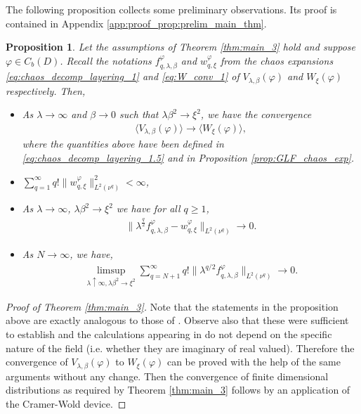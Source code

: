 \documentclass[a4paper, 11pt, reqno]{amsart}
\theoremstyle{definition} \newtheorem{defn}{Definition}[section]
\theoremstyle{remark} \newtheorem{rem}[defn]{Remark}
\theoremstyle{remark} \newtheorem*{rem*}{Remark}
\theoremstyle{plain} \newtheorem{thm}[defn]{Theorem}
\theoremstyle{plain} \newtheorem{lem}[defn]{Lemma}
\theoremstyle{plain} \newtheorem{prop}[defn]{Proposition}
\theoremstyle{plain} \newtheorem{cor}[defn]{Corollary}
\theoremstyle{remark} \newtheorem{exm}[defn]{\textbf{Example}}
\theoremstyle{remark} \newtheorem{exms}[defn]{\textbf{Examples}}
\theoremstyle{remark} \newtheorem*{bl}{}
\numberwithin{equation}{section} %
\begin{document}
	The following proposition collects some preliminary observations. Its proof is contained in Appendix \ref{app:proof_prop:prelim_main_thm}.
	\begin{prop}\label{prop:prelim_main_thm}
		Let the assumptions of Theorem \ref{thm:main_3} hold and suppose $\varphi \in C_b (D)$. Recall the notations $f^{\varphi}_{q, \lambda, \beta}$ and $w^{\varphi}_{q, \xi}$ from the chaos expansions \eqref{eq:chaos_decomp_layering_1} and \eqref{eq:W_conv_1} of $V_{\lambda, \beta}(\varphi)$ and $W_{\xi}(\varphi)$ respectively. Then, 
		\begin{itemize}
			\item[(a)] As $\lambda \to \infty$ and $\beta \to 0$ such that $\lambda \beta^2 \to \xi^2$, we have the convergence
			\begin{align}
				\langle V_{\lambda, \beta}(\varphi)\rangle \to \langle W_{\xi}(\varphi)\rangle,
			\end{align} 
			where the quantities above have been defined in \eqref{eq:chaos_decomp_layering_1.5} and in Proposition \ref{prop:GLF_chaos_exp}.
			
			\item[(b)] $\sum_{q=1}^{\infty} q! \lVert w^{\varphi}_{q, \xi} \rVert^2_{L^2(\nu^q)} <\infty$,
			
			\item[(c)] As $\lambda \to \infty$, $\lambda \beta^2 \to \xi^2$ we have for all $q \ge 1$,
			\begin{align}\label{eq:f_w_conv_0}
				\lVert \lambda^{\frac{q}{2}} f^{\varphi}_{q, \lambda, \beta} - w^{\varphi}_{q, \xi}\rVert_{L^2(\nu^q)} \to 0.
			\end{align}		
			
			\item[(d)] As $N\to \infty$, we have,
			\begin{align}
				\limsup_{\lambda\uparrow \infty, \lambda\beta^2 \to \xi ^2} \sum_{q= N+1}^{\infty} q! \lVert \lambda^{q/2} f^{\varphi}_{q,\lambda, \beta}\rVert_{L^2(\nu^q)} \to 0.
			\end{align}
		\end{itemize}		
	\end{prop} 
	
	\begin{proof}[Proof of Theorem \ref{thm:main_3}]
		Note that the statements in the proposition above are exactly analogous to those of \cite[Eqs. (6.5) - (6.8)]{cgpr21}. Observe also that these were sufficient to establish \cite[Theorem 6.2]{cgpr21} and the calculations appearing in \cite[p. 920-921]{cgpr21} do not depend on the specific nature of the field (i.e. whether they are imaginary of real valued). Therefore the convergence of $V_{\lambda, \beta}(\varphi)$ to $W_{\xi}(\varphi)$ can be proved with the help of the same arguments without any change. Then the convergence of finite dimensional distributions as required by Theorem \ref{thm:main_3} follows by an application of the Cramer-Wold device.
	\end{proof}
	
\end{document}
